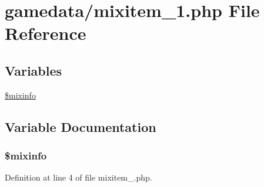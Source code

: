 \hypertarget{mixitem__1_8php}{\section{gamedata/mixitem\+\_\+1.php File Reference}
\label{mixitem__1_8php}
}
\subsection*{Variables}
\begin{DoxyCompactItemize}
\item 
\hyperlink{mixitem__1_8php_af760ceec3cca51f1e5947afbbd300d36}{\$mixinfo}
\end{DoxyCompactItemize}


\subsection{Variable Documentation}
\hypertarget{mixitem__1_8php_af760ceec3cca51f1e5947afbbd300d36}{
\subsubsection[{\$mixinfo}]{\setlength{\rightskip}{0pt plus 5cm}\$mixinfo}}\label{mixitem__1_8php_af760ceec3cca51f1e5947afbbd300d36}


Definition at line 4 of file mixitem\+\_.\+php.

